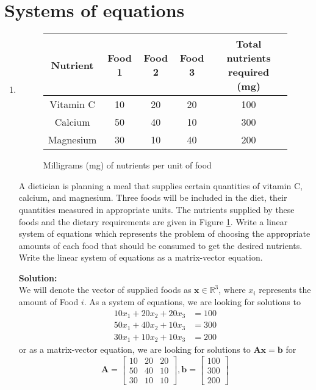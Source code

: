\documentclass[]{article}
\newcommand{\R}{\mathbb{R}}				%
\newcommand{\bbm}{\begin{bmatrix}}		%
\newcommand{\ebm}{\end{bmatrix}}		%
\newcommand{\x}{\bm{x}}					%
\newcommand{\A}{\bm{A}}					%
\newcommand{\solution}{\vskip 0.5cm \textbf{\large Solution:} \\}
\begin{document}
    \section*{Systems of equations}
    \begin{enumerate}[resume]
	\item \begin{figure}
	  \centering
	  \begin{tabular}{ccccc}
		Nutrient & Food 1 & Food 2 & Food 3 & Total nutrients required (mg) \\ \hline
		Vitamin C & 10 & 20 & 20 & 100 \\
		Calcium & 50 & 40 & 10 & 300 \\
		Magnesium & 30 & 10 & 40 & 200 \\ \hline
	  \end{tabular}
	  \caption{Milligrams (mg) of nutrients per unit of food}
	  \label{fig:diet}
	\end{figure}

	  A dietician is planning a meal that supplies certain quantities of vitamin C, calcium, and magnesium. Three foods will be included in the diet, their quantities measured in appropriate units. The nutrients supplied by these foods and the dietary requirements are given in Figure \ref{fig:diet}. Write a linear system of equations which represents the problem of choosing the appropriate amounts of each food that should be consumed to get the desired nutrients. Write the linear system of equations as a matrix-vector equation.

	  \solution We will denote the vector of supplied foods as $\x
      \in \R^3$, where $x_i$ represents the amount of Food $i$. As a
      system of equations, we are looking for solutions to
      \[\begin{split}
      10 x_1 + 20 x_2 + 20 x_3 &= 100 \\
      50 x_1 + 40 x_2 + 10 x_3 &= 300 \\
      30 x_1 + 10 x_2 + 10 x_3 &= 200
      \end{split}\]
      or as a matrix-vector equation, we are looking for solutions to $\A \x = \bm{b}$ for
      $$ \A = \bbm 10 & 20 & 20 \\ 50 & 40 & 10 \\ 30 & 10 & 10 \ebm, \bm{b} = \bbm 100 \\ 300 \\ 200 \ebm $$


\end{enumerate}
\end{document}
